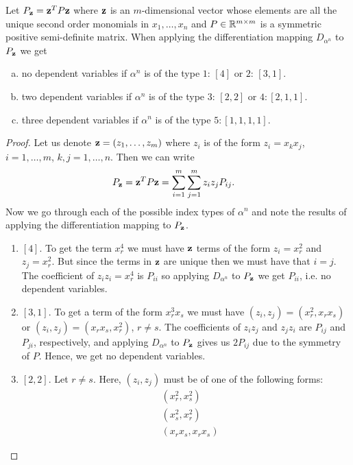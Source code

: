 \documentclass[a4paper,12pt,twoside,BCOR=10mm]{scrbook}
\begin{document}
\begin{theorem}\label{Thm dependent variables in relations}
Let $P_{\mathbf{z}} = \mathbf{z}^T P\mathbf{z}$ where $\mathbf{z}$ is an $m$-dimensional vector whose elements are all the unique second order monomials in $x_1, \dots, x_n$ and $P\in \mathbb{R}^{m \times m}$ is a symmetric positive semi-definite matrix.
When applying the differentiation mapping $D_{\alpha^n}$ to $P_{\mathbf{z}}$ we get
\begin{enumerate}[a)]
    \item no dependent variables if $\alpha^n$ is of the type $1:\, [4]$ or $2:\, [3,1]$.
    \item two dependent variables if $\alpha^n$ is of the type $3:\, [2,2]$ or $4: [2,1,1]$.
    \item three dependent variables if $\alpha^n$ is of the type $5: [1,1,1,1]$.
\end{enumerate}
\begin{proof}
Let us denote $\mathbf{z} = (z_1, \ldots, z_m)$ where $z_i$ is of the form $z_i = x_kx_j$, $i = 1, \ldots, m$, $k,j = 1, \ldots, n$. Then we can write
\begin{align*}
    P_{\mathbf{z}} &= \mathbf{z}^T P \mathbf{z} = \sum\limits_{i = 1}^m\sum\limits_{j = 1}^m z_iz_jP_{ij}.
\end{align*}
Now we go through each of the possible index types of $\alpha^n$ and note the results of applying the differentiation mapping to $P_{\mathbf{z}}$.
\begin{enumerate}[1:]
    \item $[4]$. To get the term $x_r^4$ we must have $\mathbf{z}$ terms of the form $z_i = x_r^2$ and $z_j = x_r^2$. But since the terms in $\mathbf{z}$ are unique then we must have that $i = j$. The coefficient of $z_iz_i = x_r^4$ is $P_{ii}$ so applying $D_{\alpha^n}$ to $P_{\mathbf{z}}$ we get $P_{ii}$, i.e. no dependent variables.
    \item $[3,1]$. To get a term of the form $x_r^3x_s$ we must have $(z_i, z_j) = (x_r^2, x_rx_s)$ or $(z_i, z_j) = (x_rx_s, x_r^2)$, $r \neq s$. The coefficients of $z_iz_j$ and $z_jz_i$ are $P_{ij}$ and $P_{ji}$, respectively, and applying $D_{\alpha^n}$ to $P_{\mathbf{z}}$ gives us $2P_{ij}$ due to the symmetry of $P$. Hence, we get no dependent variables.
    \item $[2,2]$. Let $r \neq s$. Here, $(z_i,z_j)$ must be of one of the following forms:
        \begin{align*}
            &(x_r^2, x_s^2)\\
            &(x_s^2, x_r^2)\\
            &(x_rx_s, x_rx_s)
        \end{align*}

\end{enumerate}
\end{proof}
\end{theorem}
\end{document}
